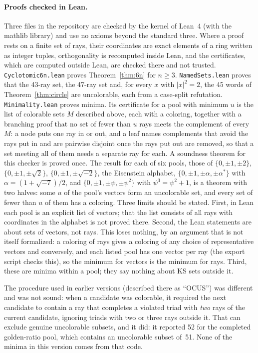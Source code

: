 \paragraph{Proofs checked in Lean.}  Three files in the repository are checked by the kernel of
Lean~4 (with the mathlib library) and use no axioms beyond the standard three.  Where a proof
rests on a finite set of rays, their coordinates are exact elements of a ring written as
integer tuples, orthogonality is recomputed inside Lean, and the certificates, which are
computed outside Lean, are checked there and not trusted.
\texttt{Cyclotomic6n.lean} proves Theorem~\ref{thm:6n} for $n\ge3$.
\texttt{NamedSets.lean} proves that the 43-ray set, the 47-ray set and, for every $x$ with
$|x|^2=2$, the 45 words of Theorem~\ref{thm:circle} are uncolorable, each from a case-split
refutation.  \texttt{Minimality.lean} proves minima.  Its certificate for a pool with minimum
$u$ is the list of colorable sets $M$ described above, each with a coloring, together with a
branching proof that no set of fewer than $u$ rays meets the complement of every~$M$: a node
puts one ray in or out, and a leaf names complements that avoid the rays put in and are pairwise
disjoint once the rays put out are removed, so that a set meeting all of them needs a separate
ray for each.  A soundness theorem for this checker is proved once.  The result for each of six
pools, those of $\{0,\pm1,\pm2\}$, $\{0,\pm1,\pm\sqrt2\}$, $\{0,\pm1,\pm\sqrt{-2}\}$, the
Eisenstein alphabet, $\{0,\pm1,\pm\alpha,\pm\alpha^{*}\}$ with $\alpha=(1+\sqrt{-7})/2$, and
$\{0,\pm1,\pm\psi,\pm\psi^2\}$ with $\psi^3=\psi^2+1$, is a theorem with two halves: some $u$ of
the pool's vectors form an uncolorable set, and every set of fewer than $u$ of them has a
coloring.  Three limits should be stated.  First, in Lean each pool is an explicit list of
vectors; that the list consists of all rays with coordinates in the alphabet is not proved
there.  Second, the Lean statements are about sets of vectors, not rays.  This loses nothing,
by an argument that is not itself formalized: a coloring of rays gives a coloring of any choice
of representative vectors and conversely, and each listed pool has one vector per ray (the
export script checks this), so the minimum for vectors is the minimum for rays.  Third, these are minima within a pool; they
say nothing about KS sets outside it.

The procedure used in earlier versions (described there as ``OCUS'') was different and was not
sound: when a candidate was colorable, it required the next candidate to contain a ray that
completes a violated triad with \emph{two} rays of the current candidate, ignoring triads with
two or three rays outside it.  That can exclude genuine uncolorable subsets, and it did: it
reported 52 for the completed golden-ratio pool, which contains an uncolorable subset of~51.
None of the minima in this version comes from that code.
